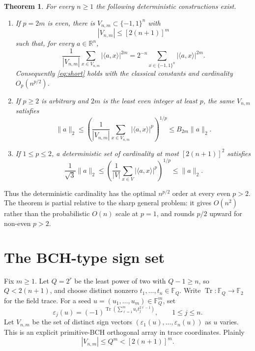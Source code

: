 \documentclass[11pt]{article}
\newtheorem{theorem}{Theorem}
\newcommand{\F}{\mathbb F}
\newcommand{\R}{\mathbb R}
\begin{document}
\begin{theorem}\label{thm:main}
For every $n\ge1$ the following deterministic constructions exist.
\begin{enumerate}
 \item If $p=2m$ is even, there is
 $V_{n,m}\subset\{-1,1\}^n$ with
 \[
   |V_{n,m}|\le [2(n+1)]^m
 \]
 such that, for every $a\in\R^n$,
 \begin{equation}\label{eq:exact}
  \frac1{|V_{n,m}|}\sum_{x\in V_{n,m}}|\langle a,x\rangle|^{2m}
  =2^{-n}\sum_{x\in\{-1,1\}^n}|\langle a,x\rangle|^{2m}.
 \end{equation}
 Consequently \eqref{eq:short} holds with the classical constants and
 cardinality $O_p(n^{p/2})$.

 \item If $p\ge2$ is arbitrary and $2m$ is the least even integer at
 least $p$, the same $V_{n,m}$ satisfies
 \[
  \|a\|_2\le
  \left(\frac1{|V_{n,m}|}\sum_{x\in V_{n,m}}
       |\langle a,x\rangle|^p\right)^{1/p}
  \le B_{2m}\|a\|_2.
 \]

 \item If $1\le p\le2$, a deterministic set of cardinality at most
 $[2(n+1)]^2$ satisfies
 \[
  \frac1{\sqrt3}\|a\|_2\le
  \left(\frac1{|V|}\sum_{x\in V}|\langle a,x\rangle|^p\right)^{1/p}
  \le\|a\|_2.
 \]
\end{enumerate}
\end{theorem}

Thus the deterministic cardinality has the optimal $n^{p/2}$ order at
every even $p>2$.  The theorem is partial relative to the sharp general
problem: it gives $O(n^2)$ rather than the probabilistic $O(n)$ scale at
$p=1$, and rounds $p/2$ upward for non-even $p>2$.

\section{The BCH-type sign set}

Fix $m\ge1$.  Let $Q=2^r$ be the least power of two with $Q-1\ge n$,
so $Q<2(n+1)$, and choose distinct nonzero
$t_1,\ldots,t_n\in\F_Q$.  Write
$\operatorname{Tr}:\F_Q\to\F_2$ for the field trace.  For a seed
$u=(u_1,\ldots,u_m)\in\F_Q^m$, set
\begin{equation}\label{eq:signs}
 \varepsilon_j(u)=(-1)^{\operatorname{Tr}
  (\sum_{\ell=1}^m u_\ell t_j^{2\ell-1})},
 \qquad 1\le j\le n.
\end{equation}
Let $V_{n,m}$ be the set of distinct sign vectors
$(\varepsilon_1(u),\ldots,\varepsilon_n(u))$ as $u$ varies.  This is an
explicit primitive-BCH orthogonal array in trace coordinates.  Plainly
\begin{equation}\label{eq:size}
 |V_{n,m}|\le Q^m<[2(n+1)]^m.
\end{equation}
\end{document}
